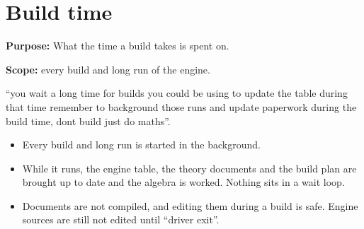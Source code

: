 \chapter{\texorpdfstring{Build time}{Build time}}
\label{chap:build-time}

\textbf{Purpose:} What the time a build takes is spent on.

\textbf{Scope:} every build and long run of the engine.

“you wait a long time for builds you could be using to update the table during that time remember to background those runs and update paperwork during the build time, dont build just do maths”.

\begin{itemize}
\item Every build and long run is started in the background.
\item While it runs, the engine table, the theory documents and the build plan are brought up to date and the algebra is worked. Nothing sits in a wait loop.
\item Documents are not compiled, and editing them during a build is safe. Engine sources are still not edited until “driver exit”.
\end{itemize}
